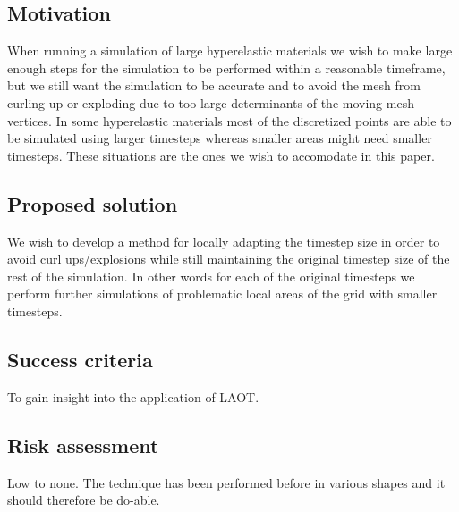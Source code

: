 \documentclass[11pt,a4paper]{article}
\begin{document}
\subsection{Motivation}
When running a simulation of large hyperelastic materials we wish to make
large enough steps for the simulation to be performed within a reasonable
timeframe, but we still want the simulation to be accurate and to avoid
the mesh from curling up or exploding due to too large determinants of the
moving mesh vertices. In some hyperelastic materials most of the
discretized points are able to be simulated using larger timesteps whereas
smaller areas might need smaller timesteps. These situations are the ones
we wish to accomodate in this paper.

\subsection{Proposed solution}
We wish to develop a method for locally adapting the timestep size in
order to avoid curl ups/explosions while still maintaining the original
timestep size of the rest of the simulation. In other words for each of
the original timesteps we perform further simulations of problematic local
areas of the grid with smaller timesteps.

\subsection{Success criteria}
To gain insight into the application of LAOT.

\subsection{Risk assessment}
Low to none. The technique has been performed before in various shapes and it
should therefore be do-able.

\cite{Keshav:2007}


\end{document}
